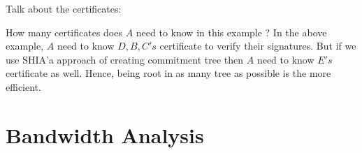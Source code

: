 Talk about the certificates:
	
	How many certificates does $A$ need to know in this example ?
	In the above example, $A$ need to know $D,B,C's$ certificate to verify their signatures.
	But if we use SHIA'a approach of creating commitment tree then $A$ need to know $E's$ certificate as well.
	Hence, being root in as many tree as possible is the more efficient.
	
\section{Bandwidth Analysis}